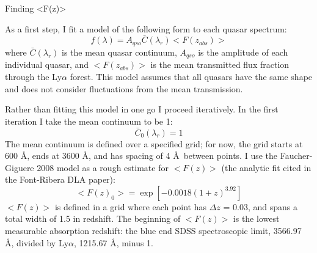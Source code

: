 \documentclass[12pt]{aastex}
\begin{document}
\begin{section}{Finding <F(z)>}

As a first step, I fit a model of the following form to each quasar spectrum:
\begin{equation}
f(\lambda) = A_{qso} \bar{C}(\lambda_{r}) <F(z_{abs})>
\label{eqn:model}
\end{equation}
where $\bar{C}(\lambda_{r})$ is the mean quasar continuum, $A_{qso}$ is the amplitude of each individual quasar, and $<F(z_{abs})>$ is the
mean transmitted flux fraction through the Ly$\alpha$ forest.  This model assumes that all quasars have the same shape and does not consider
fluctuations from the mean transmission.

Rather than fitting this model in one go I proceed iteratively.  In the first iteration I take the mean continuum to be 1:
\begin{equation}
\bar{C}_0(\lambda_{r}) = 1
\label{eqn:c0}
\end{equation}
The mean continuum is defined over a specified grid; for now, the grid starts at 600 \AA, ends at 3600 \AA, and has spacing of 4 \AA\ between points.
I use the Faucher-Giguere 2008 model as a rough estimate for $<F(z)>$ (the analytic fit cited in the Font-Ribera DLA paper):
\begin{equation}
<F(z)_0> = \exp{[-0.0018(1+z)^{3.92}]}
\label{eqn:fz0}
\end{equation}
$<F(z)>$ is defined in a grid where each point has $\Delta z$ = 0.03, and spans a total width of 1.5 in redshift.  The beginning of $<F(z)>$ is the
lowest measurable absorption redshift: the blue end SDSS spectroscopic limit, 3566.97 \AA, divided by Ly$\alpha$, 1215.67 \AA, minus 1.


\end{section}
\end{document}
